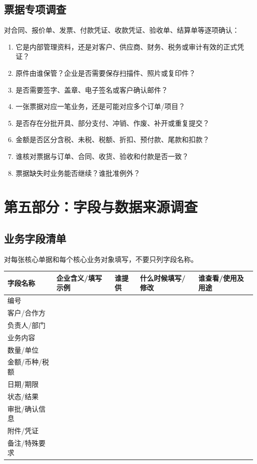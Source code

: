 \documentclass[UTF8,a4paper,11pt]{ctexart}
\begin{document}
\subsection{票据专项调查}
对合同、报价单、发票、付款凭证、收款凭证、验收单、结算单等逐项确认：
\begin{enumerate}
  \item 它是内部管理资料，还是对客户、供应商、财务、税务或审计有效的正式凭证？
  \item 原件由谁保管？企业是否需要保存扫描件、照片或复印件？
  \item 是否需要签字、盖章、电子签名或客户确认邮件？
  \item 一张票据对应一笔业务，还是可能对应多个订单/项目？
  \item 是否存在分批开具、部分支付、冲销、作废、补开或重复提交？
  \item 金额是否区分含税、未税、税额、折扣、预付款、尾款和扣款？
  \item 谁核对票据与订单、合同、收货、验收和付款是否一致？
  \item 票据缺失时业务能否继续？谁批准例外？
\end{enumerate}

\section{第五部分：字段与数据来源调查}
\subsection{业务字段清单}
对每张核心单据和每个核心业务对象填写，不要只列字段名称。
\begin{longtable}{p{}p{}p{}p{}p{}}
\toprule
字段名称 & 企业含义/填写示例 & 谁提供 & 什么时候填写/修改 & 谁查看/使用及用途 \\
\midrule
编号 & & & & \\
客户/合作方 & & & & \\
负责人/部门 & & & & \\
业务内容 & & & & \\
数量/单位 & & & & \\
金额/币种/税额 & & & & \\
日期/期限 & & & & \\
状态/结果 & & & & \\
审批/确认信息 & & & & \\
附件/凭证 & & & & \\
备注/特殊要求 & & & & \\
\bottomrule
\end{longtable}
\end{document}
